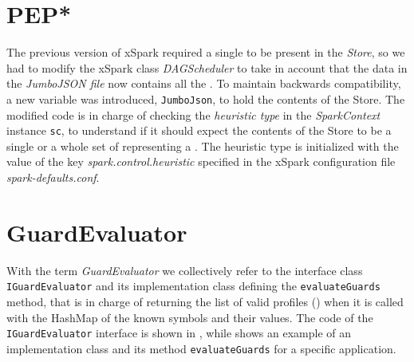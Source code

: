 \section{PEP*}\label{sec:getting_peps}
The previous version of xSpark required a single \plan to be present in the \textit{\model  Store}, so we had to modify the xSpark class \textit{DAGScheduler} to take in account that the data in the \textit{JumboJSON file} now contains all the \plans. To maintain backwards compatibility, a new variable was introduced, \texttt{JumboJson}, to hold the contents of the \model Store. The modified code is in charge of checking the \textit{heuristic type} in the \textit{SparkContext} instance \texttt{sc}, to understand if it should expect the contents of the \model Store to be a single \plan or a whole set of \plans representing a \model. The heuristic type is initialized with the value of the key \textit{spark.control.heuristic} specified in the xSpark configuration file \textit{spark-defaults.conf}. 



\section{GuardEvaluator}\label{sec:guard_evaluator}
With the term \textit{GuardEvaluator} we collectively refer to the interface class \texttt{IGuardEvaluator} and its implementation class defining the \texttt{evaluateGuards} method, that is in charge of returning the list of valid profiles (\plans) when it is called with the HashMap of the known symbols and their values. The code of the  \texttt{IGuardEvaluator} interface is shown in , while  shows an example of an implementation class and its method \texttt{evaluateGuards} for a specific application.

\vspace{1.5cm}



